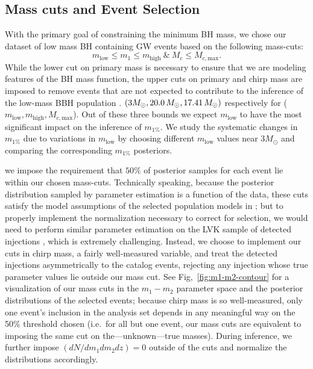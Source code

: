 \documentclass[modern]{aastex631}
\begin{document}
\subsection{Mass cuts and Event Selection}
With the primary goal of constraining the minimum BH mass, we chose our dataset of low mass BH containing GW events based on the following mass-cuts:
\begin{equation}
   m_\mathrm{low}\leq m_1 \leq m_\mathrm{high} ~\&~M_c\leq M_{c,\mathrm{max}}.
\end{equation}
While the lower cut on primary mass is necessary to ensure that we are modeling
features of the BH mass function, the upper cuts on primary and chirp mass are
imposed to remove events that are not expected to contribute to the inference of
the low-mass BBH population .  $(3M_{\odot}, 20.0 \, M_\odot,
17.41 \, M_\odot)$ respectively for ($m_\mathrm{low}, m_\mathrm{high},
M_{c,\mathrm{max}}$). Out of these three bounds we expect $m_\mathrm{low}$ to
have the most significant impact on the inference of $m_{1\%}$. We study the
systematic changes in $m_{1\%}$ due to variations in $m_\mathrm{low}$ by
choosing different $m_\mathrm{low}$ values near $3M_{\odot}$ and comparing the
corresponding $m_{1\%}$ posteriors.

 we impose the requirement that $50\%$ of posterior samples
for each event lie within our chosen mass-cuts.  Technically speaking, because
the posterior distribution sampled by parameter estimation is a function of the
data, these cuts satisfy the model assumptions of the selected population models
in \citet{Mandel:2018mve}; but to properly implement the normalization necessary
to correct for selection, we would need to perform similar parameter estimation
on the LVK sample of detected injections \citep{KAGRA:2021duu}, which is
extremely challenging.  Instead, we choose to implement our cuts in chirp mass,
a fairly well-measured variable, and treat the detected injections
asymmetrically to the catalog events, rejecting any injection whose true
parameter values lie outside our mass cut.  See Fig,~\ref{fig:m1-m2-contour} for
a visualization of our mass cuts in the $m_1-m_2$ parameter space and the
posterior distributions of the selected events; because chirp mass is so
well-measured, only one event's inclusion in the analysis set depends in any
meaningful way on the 50\% threshold chosen (i.e.\ for all but one event, our
mass cuts are equivalent to imposing the same cut on the---unknown---true
masses).  During inference, we further impose
$(dN/dm_1dm_2dz)=0$ outside of the cuts and normalize the distributions
accordingly. 
\end{document}
